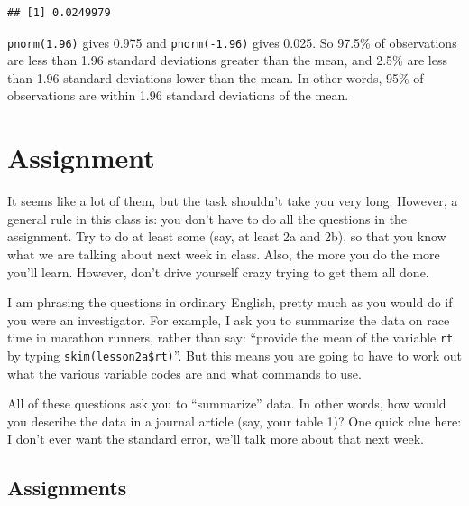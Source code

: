 \documentclass[]{book}
\begin{document}
\begin{verbatim}
## [1] 0.0249979
\end{verbatim}

\texttt{pnorm(1.96)} gives 0.975 and \texttt{pnorm(-1.96)} gives 0.025. So 97.5\% of observations are less than 1.96 standard deviations greater than the mean, and 2.5\% are less than 1.96 standard deviations lower than the mean. In other words, 95\% of observations are within 1.96 standard deviations of the mean.

\hypertarget{assignment}{%
\section{Assignment}\label{assignment}}

It seems like a lot of them, but the task shouldn't take you very long. However, a general rule in this class is: you don't have to do all the questions in the assignment. Try to do at least some (say, at least 2a and 2b), so that you know what we are talking about next week in class. Also, the more you do the more you'll learn. However, don't drive yourself crazy trying to get them all done.

I am phrasing the questions in ordinary English, pretty much as you would do if you were an investigator. For example, I ask you to summarize the data on race time in marathon runners, rather than say: ``provide the mean of the variable \texttt{rt} by typing \texttt{skim(lesson2a\$rt)}''. But this means you are going to have to work out what the various variable codes are and what commands to use.

All of these questions ask you to ``summarize'' data. In other words, how would you describe the data in a journal article (say, your table 1)? One quick clue here: I don't ever want the standard error, we'll talk more about that next week.

\hypertarget{assignments-1}{%
\subsection{Assignments}\label{assignments-1}}
\end{document}
